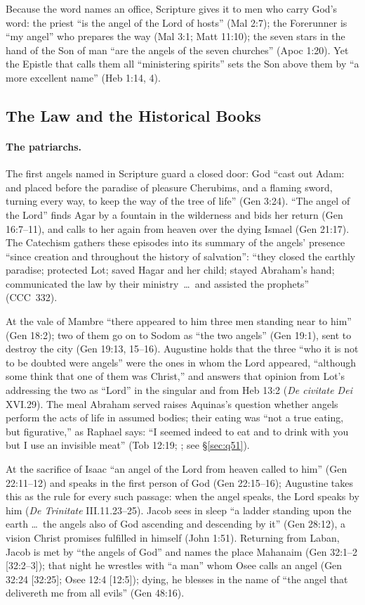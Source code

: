 Because the word names an office, Scripture gives it to men who carry
God's word: the priest ``is the angel of the Lord of hosts'' (Mal 2:7);
the Forerunner is ``my angel'' who prepares the way (Mal 3:1; Matt 11:10);
the seven stars in the hand of the Son of man ``are the angels of the
seven churches'' (Apoc 1:20). Yet the Epistle that calls them all
``ministering spirits'' sets the Son above them by ``a more excellent
name'' (Heb 1:14, 4).

\subsection{The Law and the Historical Books}

\paragraph{The patriarchs.} The first angels named in Scripture guard a
closed door: God ``cast out Adam: and placed before the paradise of pleasure
Cherubims, and a flaming sword, turning every way, to keep the way of the
tree of life'' (Gen 3:24). ``The angel of the Lord'' finds Agar by a
fountain in the wilderness and bids her return (Gen 16:7--11), and calls to
her again from heaven over the dying Ismael (Gen 21:17). The Catechism
gathers these episodes into its summary of the angels' presence ``since
creation and throughout the history of salvation'': ``they closed the
earthly paradise; protected Lot; saved Hagar and her child; stayed
Abraham's hand; communicated the law by their ministry~\dots\ and assisted
the prophets'' (CCC~332).

At the vale of Mambre ``there appeared to him three men standing near to
him'' (Gen 18:2); two of them go on to Sodom as ``the two angels'' (Gen
19:1), sent to destroy the city (Gen 19:13, 15--16). Augustine holds that
the three ``who it is not to be doubted were angels'' were the ones in whom
the Lord appeared, ``although some think that one of them was Christ,''
and answers that opinion from Lot's addressing the two as ``Lord'' in the
singular and from Heb 13:2 (\emph{De civitate Dei} XVI.29). The meal
Abraham served raises Aquinas's question whether angels perform the acts
of life in assumed bodies; their eating was ``not a true eating, but
figurative,'' as Raphael says: ``I seemed indeed to eat and to drink with
you but I use an invisible meat'' (Tob 12:19; ; see
\S\ref{sec:q51}).

At the sacrifice of Isaac ``an angel of the Lord from heaven called to
him'' (Gen 22:11--12) and speaks in the first person of God (Gen
22:15--16); Augustine takes this as the rule for every such passage: when
the angel speaks, the Lord speaks by him (\emph{De Trinitate}
III.11.23--25). Jacob sees in sleep ``a ladder standing upon the earth
\dots\ the angels also of God ascending and descending by it'' (Gen 28:12),
a vision Christ promises fulfilled in himself (John 1:51). Returning from
Laban, Jacob is met by ``the angels of God'' and names the place Mahanaim
(Gen 32:1--2 [32:2--3]); that night he wrestles with ``a man'' whom Osee
calls an angel (Gen 32:24 [32:25]; Osee 12:4 [12:5]); dying, he blesses in
the name of ``the angel that delivereth me from all evils'' (Gen 48:16).

